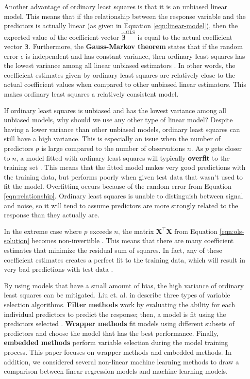 \documentclass{article}
\begin{document}
Another advantage of ordinary least squares is that it is an unbiased linear model. This means that if the relationship between the response variable and the predictors is actually linear (as given in Equation \ref{eqn:linear-model}), then the expected value of the coefficient vector $\hat{\bm{\beta}}^\text{OLS}$ is equal to the actual coefficient vector $\bm{\beta}$. Furthermore, the \textbf{Gauss-Markov theorem} states that if the random error $\epsilon$ is independent and has constant variance, then ordinary least squares has the lowest variance among all linear unbiased estimators \cite{greene2003econometric, friedman2001elements}. In other words, the coefficient estimates given by ordinary least squares are relatively close to the actual coefficient values when compared to other unbiased linear estimators. This makes ordinary least squares a relatively consistent model.

If ordinary least squares is unbiased and has the lowest variance among all unbiased models, why should we use any other type of linear model? Despite having a lower variance than other unbiased models, ordinary least squares can still have a high variance. This is especially an issue when the number of predictors $p$ is large compared to the number of observations $n$. As $p$ gets closer to $n$, a model fitted with ordinary least squares will typically \textbf{overfit} to the training set \cite{james2013introduction, friedman2001elements}. This means that the fitted model makes very good predictions with the training data, but performs poorly when given test data that wasn't used to fit the model. Overfitting occurs because of the random error from Equation \ref{eqn:relationship}. Ordinary least squares is unable to distinguish between signal and noise, so it will tend to assume predictors are more strongly related to the response than they actually are.

In the extreme case where $p$ exceeds $n$, the matrix $\mathbf{X}^\top \mathbf{X}$ from Equation \ref{eqn:ols-solution} becomes non-invertible \cite{friedman2001elements}. This means that there are many coefficient estimates that minimize the residual sum of squares. In fact, any of these coefficient estimates creates a perfect fit to the training data, which will result in very bad predictions with test data \cite{james2013introduction}.

By using models that have a small amount of bias, the high variance of ordinary least squares can be mitigated. Liu et. al. in \cite{liu2020logsum} describe three types of variable selection algorithms. \textbf{Filter methods} work by evaluating the ability for each individual predictors to predict the response; then, a model is fit using the predictors selected \cite{sanchez2007filter, ding2005minimum}. \textbf{Wrapper methods} fit models using different subsets of predictors and choose the model that has the best performance. Finally, \textbf{embedded methods} perform variable selection during the model training process. This paper focuses on wrapper methods and embedded methods. In addition, we considered several non-linear machine learning methods to draw a comparison between linear regression models and machine learning models.
\end{document}
